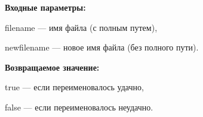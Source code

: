 \textbf{Входные параметры:}

filename --- имя файла (с полным путем),
 
    newfilename --- новое имя файла (без полного пути).

\textbf{Возвращаемое значение:}

true --- если переименовалось удачно,
 
    false --- если переименовалось неудачно.